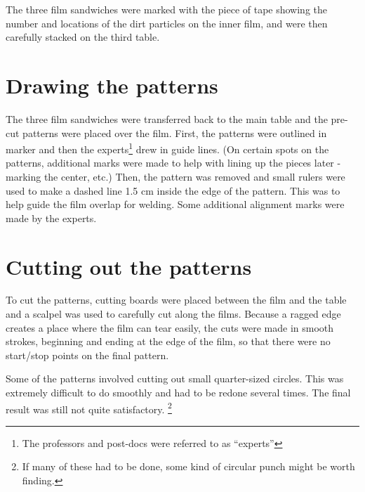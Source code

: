 \documentclass{article}
\begin{document}
The three film sandwiches were marked with the piece of tape showing the number and locations of the dirt particles on the inner film, and were then carefully stacked on the third table. 


\section{Drawing the patterns} 
The three film sandwiches were transferred back to the main table and the pre-cut patterns were placed over the film. First, the patterns were outlined in marker and then the experts\footnote{The professors and post-docs were referred to as ``experts''} drew in guide lines. (On certain spots on the patterns, additional marks were made to help with lining up the pieces later - marking the center, etc.) Then, the pattern was removed and small rulers were used to make a dashed line 1.5 cm inside the edge of the pattern. This was to help guide the film overlap for welding. Some additional alignment marks were made by the experts. 

\section{Cutting out the patterns}
To cut the patterns, cutting boards were placed between the film and the table and a scalpel was used to carefully cut along the films. Because a ragged edge creates a place where the film can tear easily, the cuts were made in smooth strokes, beginning and ending at the edge of the film, so that there were no start/stop points on the final pattern. %

Some of the patterns involved cutting out small quarter-sized circles. This was extremely difficult to do smoothly and had to be redone several times. The final result was still not quite satisfactory. \footnote{If many of these had to be done, some kind of circular punch might be worth finding.} 

\end{document}
